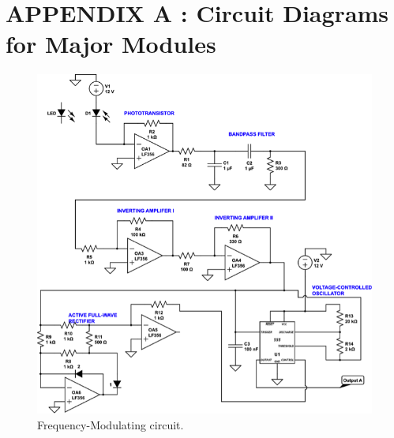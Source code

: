 \documentclass[twocolumn]{article}
\begin{document}
\section*{APPENDIX A : Circuit Diagrams for Major Modules}  
\begin{figure}[h!]
 \centering
\includegraphics[width=440pt]{figure/freq_circuit}
\caption{Frequency-Modulating circuit.}
\label{freq_circuit}
\end{figure}
\end{document}
